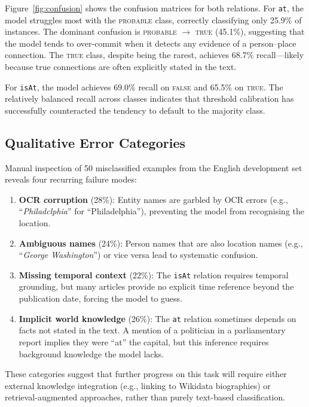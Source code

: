 Figure~\ref{fig:confusion} shows the confusion matrices for both relations. For \texttt{at}, the model struggles most with the \textsc{probable} class, correctly classifying only 25.9\% of instances. The dominant confusion is \textsc{probable} $\rightarrow$ \textsc{true} (45.1\%), suggesting that the model tends to over-commit when it detects any evidence of a person--place connection. The \textsc{true} class, despite being the rarest, achieves 68.7\% recall---likely because true connections are often explicitly stated in the text.

For \texttt{isAt}, the model achieves 69.0\% recall on \textsc{false} and 65.5\% on \textsc{true}. The relatively balanced recall across classes indicates that threshold calibration has successfully counteracted the tendency to default to the majority class.

\subsection{Qualitative Error Categories}

Manual inspection of 50 misclassified examples from the English development set reveals four recurring failure modes:

\begin{enumerate}
    \item \textbf{OCR corruption} (28\%): Entity names are garbled by OCR errors (e.g., ``\textit{Philadclphia}'' for ``Philadelphia''), preventing the model from recognising the location.
    \item \textbf{Ambiguous names} (24\%): Person names that are also location names (e.g., ``\textit{George Washington}'') or vice versa lead to systematic confusion.
    \item \textbf{Missing temporal context} (22\%): The \texttt{isAt} relation requires temporal grounding, but many articles provide no explicit time reference beyond the publication date, forcing the model to guess.
    \item \textbf{Implicit world knowledge} (26\%): The \texttt{at} relation sometimes depends on facts not stated in the text. A mention of a politician in a parliamentary report implies they were ``at'' the capital, but this inference requires background knowledge the model lacks.
\end{enumerate}

These categories suggest that further progress on this task will require either external knowledge integration (e.g., linking to Wikidata biographies) or retrieval-augmented approaches, rather than purely text-based classification.

